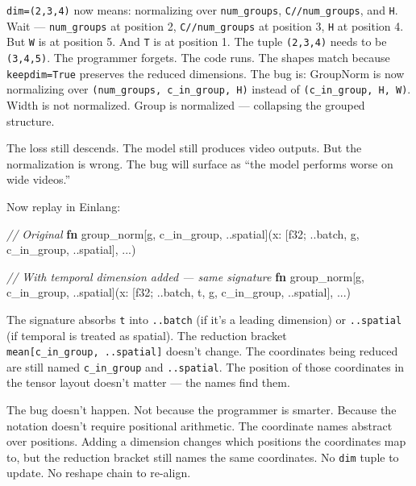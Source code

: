 \documentclass[11pt,titlepage]{article}
\newenvironment{Shaded}{}{}
\newcommand{\CommentTok}[1]{\textcolor[rgb]{0.38,0.63,0.69}{\textit{#1}}}
\newcommand{\DataTypeTok}[1]{\textcolor[rgb]{0.56,0.13,0.00}{#1}}
\newcommand{\KeywordTok}[1]{\textcolor[rgb]{0.00,0.44,0.13}{\textbf{#1}}}
\newcommand{\NormalTok}[1]{#1}
\newcommand{\OperatorTok}[1]{\textcolor[rgb]{0.40,0.40,0.40}{#1}}
\begin{document}
\texttt{dim=(2,3,4)} now means: normalizing over \texttt{num\_groups},
\texttt{C//num\_groups}, and \texttt{H}. Wait --- \texttt{num\_groups}
at position 2, \texttt{C//num\_groups} at position 3, \texttt{H} at
position 4. But \texttt{W} is at position 5. And \texttt{T} is at
position 1. The tuple \texttt{(2,3,4)} needs to be \texttt{(3,4,5)}. The
programmer forgets. The code runs. The shapes match because
\texttt{keepdim=True} preserves the reduced dimensions. The bug is:
GroupNorm is now normalizing over
\texttt{(num\_groups,\ c\_in\_group,\ H)} instead of
\texttt{(c\_in\_group,\ H,\ W)}. Width is not normalized. Group is
normalized --- collapsing the grouped structure.

The loss still descends. The model still produces video outputs. But the
normalization is wrong. The bug will surface as ``the model performs
worse on wide videos.''

Now replay in Einlang:

\begin{Shaded}
\begin{Highlighting}[]
\CommentTok{// Original}
\KeywordTok{fn}\NormalTok{ group_norm[g, c_in_group, ..spatial](x: }\OperatorTok{[}\DataTypeTok{f32}\NormalTok{; ..batch, g, c_in_group, ..spatial}\OperatorTok{]}\NormalTok{, ...)}

\CommentTok{// With temporal dimension added — same signature}
\KeywordTok{fn}\NormalTok{ group_norm[g, c_in_group, ..spatial](x: }\OperatorTok{[}\DataTypeTok{f32}\NormalTok{; ..batch, t, g, c_in_group, ..spatial}\OperatorTok{]}\NormalTok{, ...)}
\end{Highlighting}
\end{Shaded}

The signature absorbs \texttt{t} into \texttt{..batch} (if it's a
leading dimension) or \texttt{..spatial} (if temporal is treated as
spatial). The reduction bracket
\texttt{mean{[}c\_in\_group,\ ..spatial{]}} doesn't change. The
coordinates being reduced are still named \texttt{c\_in\_group} and
\texttt{..spatial}. The position of those coordinates in the tensor
layout doesn't matter --- the names find them.

The bug doesn't happen. Not because the programmer is smarter. Because
the notation doesn't require positional arithmetic. The coordinate names
abstract over positions. Adding a dimension changes which positions the
coordinates map to, but the reduction bracket still names the same
coordinates. No \texttt{dim} tuple to update. No reshape chain to
re-align.
\end{document}
